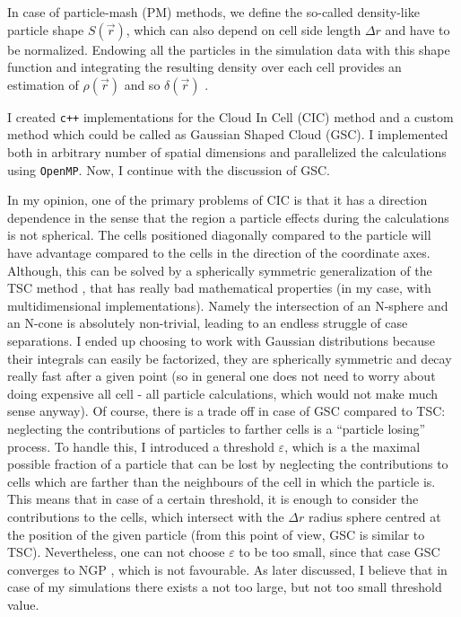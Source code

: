 \documentclass[12pt]{article}
\begin{document}
In case of particle-mash (PM) methods, we define the so-called density-like particle shape $S(\vec{r})$, which can also depend on cell side length $\Delta r$ and have to be normalized. Endowing all the particles in the simulation data with this shape function and integrating the resulting density over each cell provides an estimation of $\rho(\vec{r})$ and so $\delta(\vec{r})$ \cite{BlotNumericalMethods}.

I created \texttt{c++} implementations for the Cloud In Cell (CIC) method \cite{BlotNumericalMethods} and a custom method which could be called as Gaussian Shaped Cloud (GSC). I implemented both in arbitrary number of spatial dimensions and parallelized the calculations using \texttt{OpenMP}. Now, I continue with the discussion of GSC.

In my opinion, one of the primary problems of CIC is that it has a direction dependence in the sense that the region a particle effects during the calculations is not spherical. The cells positioned diagonally compared to the particle will have advantage compared to the cells in the direction of the coordinate axes. Although, this can be solved by a spherically symmetric generalization of the TSC method \cite{BlotNumericalMethods}, that has really bad mathematical properties (in my case, with multidimensional implementations). Namely the intersection of an N-sphere and an N-cone is absolutely non-trivial, leading to an endless struggle of case separations. I ended up choosing to work with Gaussian distributions because their integrals can easily be factorized, they are spherically symmetric and decay really fast after a given point (so in general one does not need to worry about doing expensive all cell - all particle calculations, which would not make much sense anyway). Of course, there is a trade off in case of GSC compared to TSC: neglecting the contributions of particles to farther cells is a ``particle losing'' process. To handle this, I introduced a threshold $\varepsilon$, which is a the maximal possible fraction of a particle that can be lost by neglecting the contributions to cells which are farther than the neighbours of the cell in which the particle is. This means that in case of a certain threshold, it is enough to consider the contributions to the cells, which intersect with the $\Delta r$ radius sphere centred at the position of the given particle (from this point of view, GSC is similar to TSC). Nevertheless, one can not choose $\varepsilon$ to be too small, since that case GSC converges to NGP \cite{BlotNumericalMethods}, which is not favourable. As later discussed, I believe that in case of my simulations there exists a not too large, but not too small threshold value.
\end{document}
